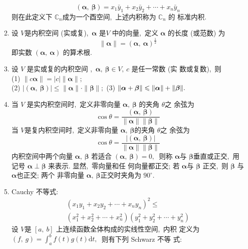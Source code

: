 \begin{enumerate}
		$$(\boldsymbol{\alpha},\  \boldsymbol{\beta})=x_{1} \bar{y}_{1}+x_{2} \bar{y}_{2}+\cdots+x_{n} \bar{y}_{n}$$
		则在此定义下 $ \mathbb{C}_{n}  $成为一个酉空间,\  上述内积称为  $\mathbb{C}_{n} $ 的 标准内积.
		\item 设  $V  $是内积空间 (实或复),\ $  \boldsymbol{\alpha} $ 是$  V $ 中的向量,\  定义  $\boldsymbol{\alpha} $ 的长度 (或范数) 为
		$$\|\boldsymbol{\alpha}\|=(\boldsymbol{\alpha},\  \boldsymbol{\alpha})^{\frac{1}{2}}$$
		即实数  $(\boldsymbol{\alpha},\  \boldsymbol{\alpha}) $ 的算术根.
		\item 设 $ V $ 是实或复的内积空间  ,\  $\boldsymbol{\alpha},\  \boldsymbol{\beta} \in V,\  c $ 是任一常数 (实 数或复数),\  则\\
		(1)  $\|c \boldsymbol{\alpha}\|=|c|\|\boldsymbol{\alpha}\| ;$\\
		(2) $ |(\boldsymbol{\alpha},\  \boldsymbol{\beta})| \leqslant\|\boldsymbol{\alpha}\| \cdot\|\boldsymbol{\beta}\| ;$
		(3) $ \|\boldsymbol{\alpha}+\boldsymbol{\beta}\|\\ \leqslant\|\boldsymbol{\alpha}\|+\|\boldsymbol{\beta}\| .$
		\item 当  $V$  是实内积空间时,\  定义非零向量 $ \boldsymbol{\alpha},\  \boldsymbol{\beta} $ 的夹角  $\theta  $之 余弦为
		$$\cos \theta=\frac{(\boldsymbol{\alpha},\  \boldsymbol{\beta})}{\|\boldsymbol{\alpha}\|\|\boldsymbol{\beta}\|}$$
		当 $ V  $是复内积空间时,\  定义非零向量  $\boldsymbol{\alpha},\  \boldsymbol{\beta}  $的夹角 $ \theta  $之 余弦为
		$$\cos \theta=\frac{|(\boldsymbol{\alpha},\  \boldsymbol{\beta})|}{\|\boldsymbol{\alpha}\|\|\boldsymbol{\beta}\|}$$
		内积空间中两个向量 $ \boldsymbol{\alpha},\  \boldsymbol{\beta} $ 若适合  $(\boldsymbol{\alpha},\  \boldsymbol{\beta})=0 ,\ $ 则称  $\boldsymbol{\alpha}  $与 $ \boldsymbol{\beta} $垂直或正交,\  用记号 $ \boldsymbol{\alpha} \perp \boldsymbol{\beta}$  来表示. 显然,\  零向量和任 何向量都正交; 若 $\boldsymbol{\alpha} $与 $ \boldsymbol{\beta}$ 正交,\  则  $\boldsymbol{\beta}$  与 $ \boldsymbol{\alpha}  $也正交; 两个 非零向量  $\boldsymbol{\alpha},\  \boldsymbol{\beta}  $正交时夹角为 $ 90^{\circ} .$
		\item Cauchy 不等式:
		$$\begin{array}{c}
			\left(x_{1} y_{1}+x_{2} y_{2}+\cdots+x_{n} y_{n}\right)^{2} \leqslant \\
			\left(x_{1}^{2}+x_{2}^{2}+\cdots+x_{n}^{2}\right)\left(y_{1}^{2}+y_{2}^{2}+\cdots+y_{n}^{2}\right)
		\end{array}$$
		设  $V  $是 $ [a,\  b]$  上连续函数全体构成的实线性空间,\  内积 定义为  $(f,\  g)=\int_{a}^{b} f(t) g(t) \mathrm{d} t ,\ $ 则有下列 Schwarz 不等 式:

\end{enumerate}
